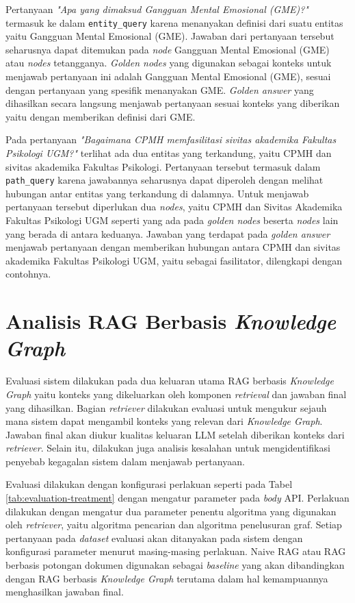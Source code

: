 Pertanyaan \textit{"Apa yang dimaksud Gangguan Mental Emosional (GME)?"} termasuk ke dalam \texttt{entity\_query} karena menanyakan definisi dari suatu entitas yaitu Gangguan Mental Emosional (GME).
Jawaban dari pertanyaan tersebut seharusnya dapat ditemukan pada \textit{node} Gangguan Mental Emosional (GME) atau \textit{nodes} tetangganya.
\textit{Golden nodes} yang digunakan sebagai konteks untuk menjawab pertanyaan ini adalah Gangguan Mental Emosional (GME), sesuai dengan pertanyaan yang spesifik menanyakan GME.
\textit{Golden answer} yang dihasilkan secara langsung menjawab pertanyaan sesuai konteks yang diberikan yaitu dengan memberikan definisi dari GME.

Pada pertanyaan \textit{"Bagaimana CPMH memfasilitasi sivitas akademika Fakultas Psikologi UGM?"} terlihat ada dua entitas yang terkandung, yaitu CPMH dan sivitas akademika Fakultas Psikologi.
Pertanyaan tersebut termasuk dalam \texttt{path\_query} karena jawabannya seharusnya dapat diperoleh dengan melihat hubungan antar entitas yang terkandung di dalamnya.
Untuk menjawab pertanyaan tersebut diperlukan dua \textit{nodes}, yaitu CPMH dan Sivitas Akademika Fakultas Psikologi UGM seperti yang ada pada \textit{golden nodes} beserta \textit{nodes} lain yang berada di antara keduanya.
Jawaban yang terdapat pada \textit{golden answer} menjawab pertanyaan dengan memberikan hubungan antara CPMH dan sivitas akademika Fakultas Psikologi UGM, yaitu sebagai fasilitator, dilengkapi dengan contohnya.

\section{Analisis RAG Berbasis \textit{Knowledge Graph}}
Evaluasi sistem dilakukan pada dua keluaran utama RAG berbasis \textit{Knowledge Graph} yaitu konteks yang dikeluarkan oleh komponen \textit{retrieval} dan jawaban final yang dihasilkan.
Bagian \textit{retriever} dilakukan evaluasi untuk mengukur sejauh mana sistem dapat mengambil konteks yang relevan dari \textit{Knowledge Graph}.
Jawaban final akan diukur kualitas keluaran LLM setelah diberikan konteks dari \textit{retriever}.
Selain itu, dilakukan juga analisis kesalahan untuk mengidentifikasi penyebab kegagalan sistem dalam menjawab pertanyaan.

Evaluasi dilakukan dengan konfigurasi perlakuan seperti pada Tabel \ref{tab:evaluation-treatment} dengan mengatur parameter pada \textit{body} API.
Perlakuan dilakukan dengan mengatur dua parameter penentu algoritma yang digunakan oleh \textit{retriever}, yaitu algoritma pencarian dan algoritma penelusuran graf.
Setiap pertanyaan pada \textit{dataset} evaluasi akan ditanyakan pada sistem dengan konfigurasi parameter menurut masing-masing perlakuan.
Naive RAG atau RAG berbasis potongan dokumen digunakan sebagai \textit{baseline} yang akan dibandingkan dengan RAG berbasis \textit{Knowledge Graph} terutama dalam hal kemampuannya menghasilkan jawaban final.

